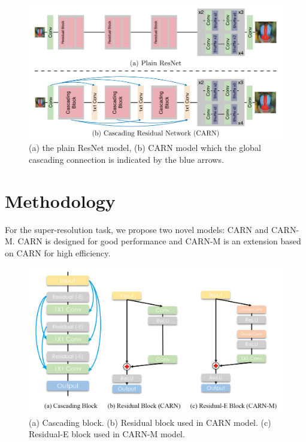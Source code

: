 \documentclass[final]{cvpr}
\begin{document}
\begin{figure}
\begin{center}
    \includegraphics[width=1\linewidth]{cvpr21/CARN.jpg}
\end{center}
   \caption{(a) the plain ResNet model, (b) CARN model which the global cascading connection is indicated by the blue arrows.}
\label{CARN}
\end{figure}


\section{Methodology}

For the super-resolution task, we propose two novel models: CARN and CARN-M. CARN is designed for good performance and CARN-M is an extension based on CARN for high efficiency.

\begin{figure}
\begin{center}
    \includegraphics[width=1\linewidth]{cvpr21/blocks.png}
\end{center}
   \caption{(a) Cascading block. (b) Residual block used in CARN model. (c) Residual-E block used in CARN-M model.}
\label{blocks}
\end{figure}
\end{document}
